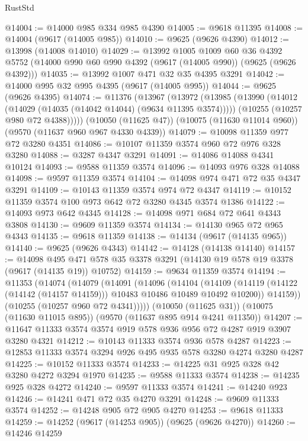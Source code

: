 \begin{lexlean}{RustStd}
\begin{coremodule}
{\begin{coremodule}
{{{{{{{{{{{{{{{{{{{{{{{{{{{{{{{{{@14004 := @14000 @985 @334 @985 @4390
@14005 := @9618 @11395
@14008 := @14004 (@9617 (@14005 @985))
@14010 := @9625 (@9626 @4390)
@14012 := @13998 (@14008 @14010)
@14029 := @13992
    @1005
    @1009
    @60
    @36
    @4392
    @5752
    (@14000 @990 @60 @990 @4392 (@9617 (@14005 @990)) (@9625 (@9626 @4392)))
@14035 := @13992 @1007 @471 @32 @35 @4395 @3291
@14042 := @14000 @995 @32 @995 @4395 (@9617 (@14005 @995))
@14044 := @9625 (@9626 @4395)
@14074 := @11376
    (@13967
      (@13972
        (@13985
          (@13990 (@14012 (@14029 (@14035 (@14042 @14044) (@9634 @11395 @3574)))))
          (@10255 (@10257 @980 @72 @4388)))))
    (@10050 (@11625 @47))
    (@10075 (@11630 @11014 @960))
    (@9570 (@11637 @960 @967 @4330 @4339))
@14079 := @10098 @11359 @977 @72 @3280 @4351
@14086 := @10107 @11359 @3574 @960 @72 @976 @328 @3280
@14088 := @3287 @4347 @3291
@14091 := @14086 @14088 @4341 @10124
@14093 := @9588 @11359 @3574
@14096 := @14093 @976 @328 @14088
@14098 := @9597 @11359 @3574
@14104 := @14098 @974 @471 @72 @35 @4347 @3291
@14109 := @10143 @11359 @3574 @974 @72 @4347
@14119 := @10152 @11359 @3574 @100 @973 @642 @72 @3280 @4345 @3574 @1386
@14122 := @14093 @973 @642 @4345
@14128 := @14098 @971 @684 @72 @641 @4343 @3808
@14130 := @9609 @11359 @3574
@14134 := @14130 @965 @72 @965 @4343
@14135 := @9618 @11359
@14138 := @14134 (@9617 (@14135 @965))
@14140 := @9625 (@9626 @4343)
@14142 := @14128 (@14138 @14140)
@14157 := @14098
    @495
    @471
    @578
    @35
    @3378
    @3291
    (@14130 @19 @578 @19 @3378 (@9617 (@14135 @19)) @10752)
@14159 := @9634 @11359 @3574
@14194 := @11353
    (@14074
      (@14079
        (@14091
          (@14096
            (@14104
              (@14109 (@14119 (@14122 (@14142 (@14157 @14159))) @10483 @10486 @10489 @10492 @10200))
              @14159))
          (@10255 (@10257 @960 @72 @4341)))))
    (@10050 (@11625 @31))
    (@10075 (@11630 @11015 @895))
    (@9570 (@11637 @895 @914 @4241 @11350))
@14207 := @11647 @11333 @3574 @3574 @919 @578 @936 @956 @72 @4287 @919 @3907 @3280 @4321
@14212 := @10143 @11333 @3574 @936 @578 @4287
@14223 := @12853 @11333 @3574 @3294 @926 @495 @935 @578 @3280 @4274 @3280 @4287
@14225 := @10152 @11333 @3574
@14233 := @14225 @31 @925 @328 @42 @3280 @4272 @3294 @1970
@14235 := @9588 @11333 @3574
@14238 := @14235 @925 @328 @4272
@14240 := @9597 @11333 @3574
@14241 := @14240 @923
@14246 := @14241 @471 @72 @35 @4270 @3291
@14248 := @9609 @11333 @3574
@14252 := @14248 @905 @72 @905 @4270
@14253 := @9618 @11333
@14259 := @14252 (@9617 (@14253 @905)) (@9625 (@9626 @4270))
@14260 := @14246 @14259
}}}}}}}}}}}}}}}}}}}}}}}}}}}}}}}}}
\end{coremodule}}
\end{coremodule}
\end{lexlean}
